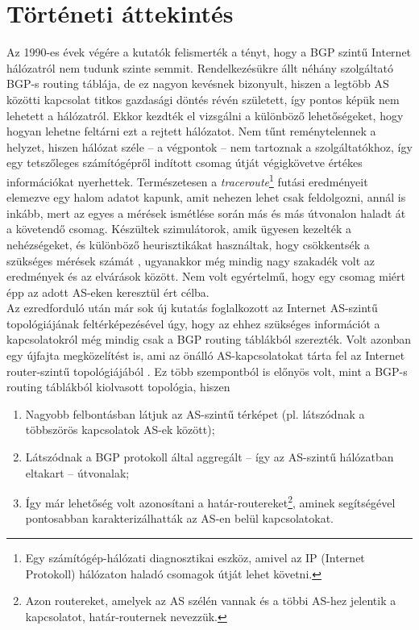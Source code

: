   \section{Történeti áttekintés}\label{section_tortenelem}

  Az 1990-es évek végére a kutatók felismerték a tényt, hogy a BGP szintű Internet hálózatról nem tudunk szinte semmit. Rendelkezésükre állt néhány szolgáltató BGP-s routing táblája, de ez nagyon kevésnek bizonyult, hiszen a legtöbb AS közötti kapcsolat titkos gazdasági döntés révén született, így pontos képük nem lehetett a hálózatról. Ekkor kezdték el vizsgálni a különböző lehetőségeket, hogy hogyan lehetne feltárni ezt a rejtett hálózatot. Nem tűnt reménytelennek a helyzet, hiszen hálózat széle -- a végpontok -- nem tartoznak a szolgáltatókhoz, így egy tetszőleges számítógépről indított csomag útját végigkövetve értékes információkat nyerhettek. Természetesen a \emph{traceroute}\footnote{Egy számítógép-hálózati diagnosztikai eszköz, amivel az IP (Internet Protokoll) hálózaton haladó csomagok útját lehet követni.} futási eredményeit elemezve egy halom adatot kapunk, amit nehezen lehet csak feldolgozni, annál is inkább, mert az egyes a mérések ismétlése során más és más útvonalon haladt át a követendő csomag. Készültek szimulátorok, amik ügyesen kezelték a nehézségeket, és különböző heurisztikákat használtak, hogy csökkentsék a szükséges mérések számát \cite{Heuristics_for_Internet_Map_Discovery}, ugyanakkor még mindig nagy szakadék volt az eredmények és az elvárások között. Nem volt egyértelmű, hogy egy csomag miért épp az adott AS-eken keresztül ért célba.\\

  Az ezredforduló után már sok új kutatás foglalkozott az Internet AS-szintű topológiájának feltérképezésével úgy, hogy az ehhez szükséges információt a kapcsolatokról még mindig csak a BGP routing táblákból szerezték. Volt azonban egy újfajta megközelítést is, ami az önálló AS-kapcsolatokat tárta fel az Internet router-szintű topológiájából \cite{Inferring_AS_level_Internet_Topology_from_Router_Level_Path_Traces}. Ez több szempontból is előnyös volt, mint a BGP-s routing táblákból kiolvasott topológia, hiszen
  \begin{enumerate}
    \item Nagyobb felbontásban látjuk az AS-szintű térképet (pl. látszódnak a többszörös kapcsolatok AS-ek között);
    \item Látszódnak a BGP protokoll által aggregált -- így az AS-szintű hálózatban eltakart -- útvonalak;
    \item Így már lehetőség volt azonosítani a határ-routereket\footnote{Azon routereket, amelyek az AS szélén vannak és a többi AS-hez jelentik a kapcsolatot, határ-routernek nevezzük.}, aminek segítségével pontosabban karakterizálhatták az AS-en belül kapcsolatokat.
  \end{enumerate}

